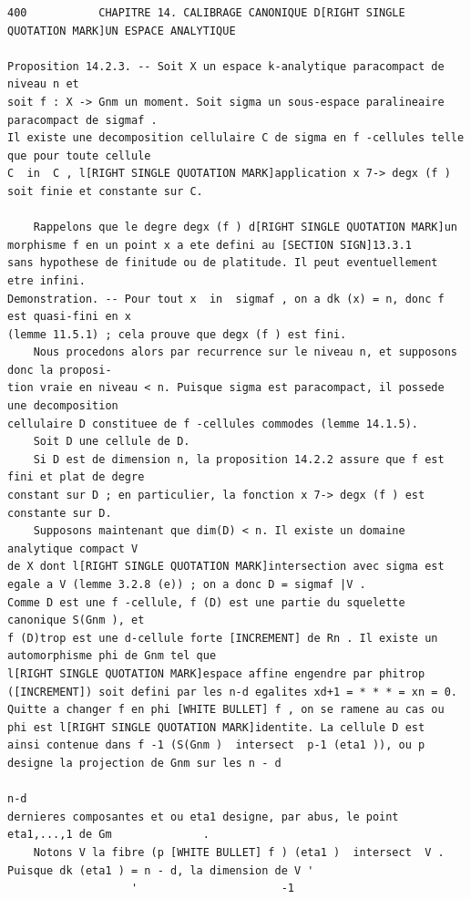 \documentclass[
  11pt,
]{article}
\begin{document}
\begin{lstlisting}
400           CHAPITRE 14. CALIBRAGE CANONIQUE D[RIGHT SINGLE QUOTATION MARK]UN ESPACE ANALYTIQUE

Proposition 14.2.3. -- Soit X un espace k-analytique paracompact de niveau n et
soit f : X -> Gnm un moment. Soit sigma un sous-espace paralineaire paracompact de sigmaf .
Il existe une decomposition cellulaire C de sigma en f -cellules telle que pour toute cellule
C  in  C , l[RIGHT SINGLE QUOTATION MARK]application x 7-> degx (f ) soit finie et constante sur C.

    Rappelons que le degre degx (f ) d[RIGHT SINGLE QUOTATION MARK]un morphisme f en un point x a ete defini au [SECTION SIGN]13.3.1
sans hypothese de finitude ou de platitude. Il peut eventuellement etre infini.
Demonstration. -- Pour tout x  in  sigmaf , on a dk (x) = n, donc f est quasi-fini en x
(lemme 11.5.1) ; cela prouve que degx (f ) est fini.
    Nous procedons alors par recurrence sur le niveau n, et supposons donc la proposi-
tion vraie en niveau < n. Puisque sigma est paracompact, il possede une decomposition
cellulaire D constituee de f -cellules commodes (lemme 14.1.5).
    Soit D une cellule de D.
    Si D est de dimension n, la proposition 14.2.2 assure que f est fini et plat de degre
constant sur D ; en particulier, la fonction x 7-> degx (f ) est constante sur D.
    Supposons maintenant que dim(D) < n. Il existe un domaine analytique compact V
de X dont l[RIGHT SINGLE QUOTATION MARK]intersection avec sigma est egale a V (lemme 3.2.8 (e)) ; on a donc D = sigmaf |V .
Comme D est une f -cellule, f (D) est une partie du squelette canonique S(Gnm ), et
f (D)trop est une d-cellule forte [INCREMENT] de Rn . Il existe un automorphisme phi de Gnm tel que
l[RIGHT SINGLE QUOTATION MARK]espace affine engendre par phitrop ([INCREMENT]) soit defini par les n-d egalites xd+1 = * * * = xn = 0.
Quitte a changer f en phi [WHITE BULLET] f , on se ramene au cas ou phi est l[RIGHT SINGLE QUOTATION MARK]identite. La cellule D est
ainsi contenue dans f -1 (S(Gnm )  intersect  p-1 (eta1 )), ou p designe la projection de Gnm sur les n - d
                                                                                   n-d
dernieres composantes et ou eta1 designe, par abus, le point eta1,...,1 de Gm              .
    Notons V la fibre (p [WHITE BULLET] f ) (eta1 )  intersect  V . Puisque dk (eta1 ) = n - d, la dimension de V '
                   '                      -1


\end{lstlisting}
\end{document}

